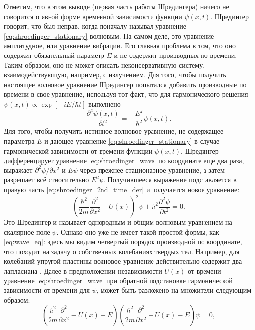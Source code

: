 \documentclass[14pt, a4paper]{extreport}
\numberwithin{equation}{section}
\begin{document}
Отметим, что в этом выводе (первая часть работы Шредингера) ничего не говорится о явной форме временной зависимости функции $\psi(x, t)$. Шредингер говорит, что был неправ, когда поначалу называл уравнение \eqref{eq:shroedinger_stationary} волновым. На самом деле, это уравнение амплитудное, или уравнение вибрации. Его главная проблема в том, что оно содержит обязательный параметр $E$ и не содержит производных по времени. Таким образом, оно не может описать неконсервативную систему, взаимодействующую, например, с излучением. Для того, чтобы получить настоящее волновое уравнение Шредингер попытался добавить производные по времени в свое уравнение, используя тот факт, что для гармонического решения $\psi(x,t) \propto \exp[-i E/\hbar t]$ выполнено
\begin{equation}
	\frac{\partial^2 \psi(x,t)}{\partial t^2} = - \frac{E^2}{\hbar^2} \psi(x,t).\label{eq:shroedinger_2nd_time_der}
\end{equation}
Для того, чтобы получить истинное волновое уравнение, не содержащее параметра $E$ и дающее уравнение \eqref{eq:shroedinger_stationary} в случае гармонической зависимости от времени функции $\psi(x,t)$, Шредингер дифференцирует уравнение \eqref{eq:shroedinger_wave} по координате еще два раза, выражает $\partial^2\psi/\partial x^2$ и $E\psi$ через прежнее стационарное уравнение, а затем разрешает всё относительно $E^2\psi$. Получившееся выражение подставляется в правую часть \eqref{eq:shroedinger_2nd_time_der} и получается новое уравнение:
\begin{equation}
	\left( \frac{\hbar^2}{2m}\frac{\partial^2}{\partial x^2} - U(x)\right)^2 \psi + \hbar^2\frac{\partial^2 \psi}{\partial t^2} = 0.\label{eq:shroedinger_wave}
\end{equation}
Это Шредингер и называет однородным и общим волновым уравнением на скалярное поле $\psi$. Однако оно уже не имеет такой простой формы, как \eqref{eq:wave_eq}: здесь мы видим четвертый порядок производной по координате, что походит на задачу о собственных колебаниях твердых тел. Например, для колебаний упругой пластины волновое уравнение действительно содержит два лапласиана \cite{hilbertcourant}.
Далее в предположении независимости $ U(x) $ от времени уравнение \eqref{eq:shroedinger_wave} при обратной подстановке гармонической зависимости от времени для $\psi$, может быть разложено на множители следующим образом:
\begin{equation}
	\left(\frac{\hbar^2}{2m}\frac{\partial^2}{\partial x^2} - U(x) + E \right)\left(\frac{\hbar^2}{2m}\frac{\partial^2}{\partial x^2} - U(x) - E \right)\psi = 0,
\end{equation}
\end{document}
